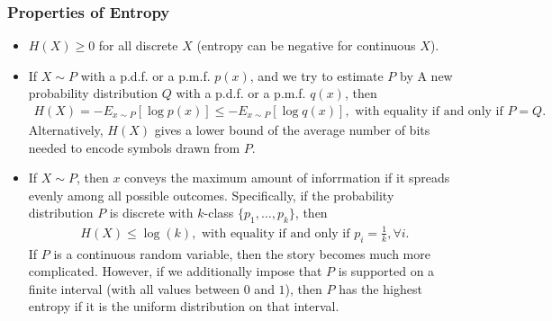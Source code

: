 \documentclass[a4paper,12pt]{article}
\theoremstyle{definition}
\begin{document}
\subsubsection*{Properties of Entropy}
\begin{itemize}
    \item $H(X) \geq 0$ for all discrete $X$ (entropy can be negative for continuous $X$).
    \item If $X \sim P$ with a p.d.f. or a p.m.f. $p(x)$, and we try to estimate $P$ by A
    new probability distribution $Q$ with a p.d.f. or a p.m.f. $q(x)$, then
    \begin{align*}
        H(X) = - E_{x \sim P} [\log p(x)] \leq  - E_{x \sim P} [\log q(x)], \text{ with equality if and only if } P = Q.
    \end{align*}
    Alternatively, $H(X)$ gives a lower bound of the average number of bits needed to 
    encode symbols drawn from $P$.
    \item If $X \sim P$, then $x$ conveys the maximum amount of inforrmation if it spreads
    evenly among all possible outcomes. Specifically, if the probability distribution $P$ 
    is discrete with $k$-class $\{p_1, \ldots, p_k \}$, then
    \begin{align*}
        H(X) \leq \log(k), \text{ with equality if and only if } p_i = \frac{1}{k}, \forall i.
    \end{align*}
    If $P$ is a continuous random variable, then the story becomes much more complicated. 
    However, if we additionally impose that $P$ is supported on a finite interval 
    (with all values between $0$ and $1$), then $P$ has the highest entropy if it is the 
    uniform distribution on that interval.
\end{itemize}
\end{document}
